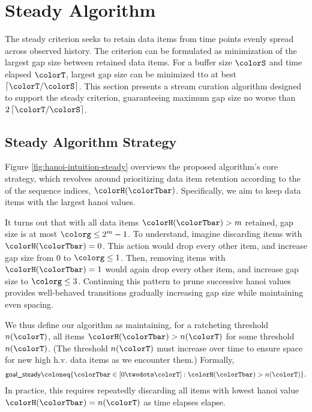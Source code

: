\section{Steady Algorithm} \label{sec:steady}

The steady criterion seeks to retain data items from time points evenly spread across observed history.
The criterion can be formulated as minimization of the largest gap size between retained data items.
For a buffer size $\colorS$ and time elapsed $\colorT$, largest gap size can be minimized tto at best $\left\lceil \colorT / \colorS \right\rceil$.
This section presents a stream curation algorithm designed to support the steady criterion, guaranteeing maximum gap size no worse than $2\left\lceil \colorT / \colorS \right\rceil$.

\subsection{Steady Algorithm Strategy}
\label{sec:steady-strategy}

Figure \ref{fig:hanoi-intuition-steady} overviews the proposed algorithm's core strategy, which revolves around prioritizing data item retention according to the \hv{} of the sequence indices, $\colorH(\colorTbar)$.
Specifically, we aim to keep data items with the largest hanoi values.

It turns out that with all data items $\colorH(\colorTbar) > m$ retained, gap size is at most $\colorg \leq 2^m - 1$.
To understand, imagine discarding items with $\colorH(\colorTbar) = 0$.
This action would drop every other item, and increase gap size from 0 to $\colorg \leq 1$.
Then, removing items with $\colorH(\colorTbar) = 1$ would again drop every other item, and increase gap size to $\colorg \leq 3$.
Continuing this pattern to prune successive hanoi values provides well-behaved transitions gradually increasing gap size while maintaining even spacing.

We thus define our algorithm as maintaining, for a ratcheting threshold $n(\colorT)$, all items $\colorH(\colorTbar) > n(\colorT)$ for some threshold $n(\colorT)$.
(The threshold $n(\colorT)$ must increase over time to ensure space for new high h.v. data items as we encounter them.)
Formally,
\begin{align*}
\textsf{goal\_steady}
\coloneq \{
\colorTbar \in [0 \twodots \colorT]
: \colorH(\colorTbar) > n(\colorT)
\}.
\end{align*}
In practice, this requires repeatedly discarding all items with lowest hanoi value $\colorH(\colorTbar) = n(\colorT)$ as time elapses elapse.

